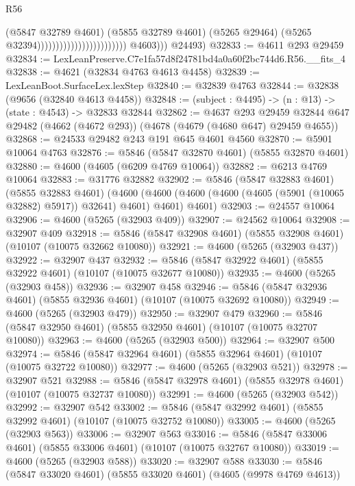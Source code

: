\begin{lexlean}{R56}
\begin{coremodule}
                                                          (@5847 @32789 @4601)
                                                          (@5855 @32789 @4601)
                                                          (@5265 @29464)
                                                          (@5265 @32394))))))))))))))))))))))))
            @4603)))
      @24493)
@32833 := @4611 @293 @29459
@32834 := LexLeanPreserve.C7e1fa57d8f24781bd4a0a60f2bc744d6.R56.__fits_4
@32838 := @4621 (@32834 @4763 @4613 @4458)
@32839 := LexLeanBoot.SurfaceLex.lexStep
@32840 := @32839 @4763
@32844 := @32838 (@9656 (@32840 @4613 @4458))
@32848 := (subject : @4495) -> (n : @13) -> (state : @4543) -> @32833 @32844
@32862 := @4637
    @293
    @29459
    @32844
    @647
    @29482
    (@4662 (@4672 @293))
    (@4678 (@4679 (@4680 @647) @29459 @4655))
@32868 := @24533 @29482 @243 @191 @645 @4601 @4560
@32870 := @5901 @10064 @4763
@32876 := @5846 (@5847 @32870 @4601) (@5855 @32870 @4601)
@32880 := @4600 (@4605 (@6209 @4769 @10064))
@32882 := @6213 @4769 @10064
@32883 := @31776 @32882
@32902 := @5846
    (@5847 @32883 @4601)
    (@5855 @32883 @4601)
    (@4600 (@4600 (@4600 (@4600 (@4605 (@5901 (@10065 @32882) @5917)) @32641) @4601) @4601) @4601)
@32903 := @24557 @10064
@32906 := @4600 (@5265 (@32903 @409))
@32907 := @24562 @10064
@32908 := @32907 @409
@32918 := @5846 (@5847 @32908 @4601) (@5855 @32908 @4601) (@10107 (@10075 @32662 @10080))
@32921 := @4600 (@5265 (@32903 @437))
@32922 := @32907 @437
@32932 := @5846 (@5847 @32922 @4601) (@5855 @32922 @4601) (@10107 (@10075 @32677 @10080))
@32935 := @4600 (@5265 (@32903 @458))
@32936 := @32907 @458
@32946 := @5846 (@5847 @32936 @4601) (@5855 @32936 @4601) (@10107 (@10075 @32692 @10080))
@32949 := @4600 (@5265 (@32903 @479))
@32950 := @32907 @479
@32960 := @5846 (@5847 @32950 @4601) (@5855 @32950 @4601) (@10107 (@10075 @32707 @10080))
@32963 := @4600 (@5265 (@32903 @500))
@32964 := @32907 @500
@32974 := @5846 (@5847 @32964 @4601) (@5855 @32964 @4601) (@10107 (@10075 @32722 @10080))
@32977 := @4600 (@5265 (@32903 @521))
@32978 := @32907 @521
@32988 := @5846 (@5847 @32978 @4601) (@5855 @32978 @4601) (@10107 (@10075 @32737 @10080))
@32991 := @4600 (@5265 (@32903 @542))
@32992 := @32907 @542
@33002 := @5846 (@5847 @32992 @4601) (@5855 @32992 @4601) (@10107 (@10075 @32752 @10080))
@33005 := @4600 (@5265 (@32903 @563))
@33006 := @32907 @563
@33016 := @5846 (@5847 @33006 @4601) (@5855 @33006 @4601) (@10107 (@10075 @32767 @10080))
@33019 := @4600 (@5265 (@32903 @588))
@33020 := @32907 @588
@33030 := @5846 (@5847 @33020 @4601) (@5855 @33020 @4601) (@4605 (@9978 @4769 @4613))

\end{coremodule}
\end{lexlean}
